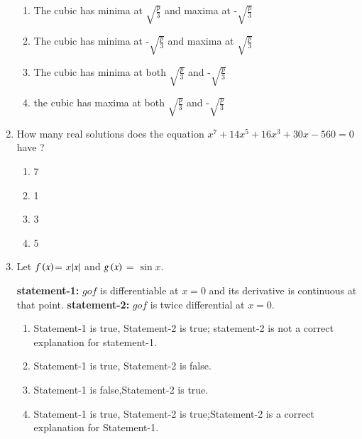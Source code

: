 \documentclass[journal,12pt,onecolumn]{IEEEtran}
\theoremstyle{remark}
\begin{document}
\begin{enumerate}
\begin{enumerate}
        \item The cubic has minima at $\sqrt{\frac{p}{3}}$ and maxima at -$\sqrt{\frac{p}{3}}$
        \item The cubic has minima at -$\sqrt{\frac{p}{3}}$ and maxima at $\sqrt{\frac{p}{3}}$
        \item The cubic has minima at both $\sqrt{\frac{p}{3}}$ and -$\sqrt{\frac{p}{3}}$
        \item the cubic has maxima at both $\sqrt{\frac{p}{3}}$ and -$\sqrt{\frac{p}{3}}$
        
        
        \end{enumerate}
        
            
        \item How many real solutions does the equation $ x^7 + 14x^5 + 16x^3 + 30x- 560 = 0$ have ? \hfill{}
         \begin{multicols}{4}
        \begin{enumerate}
    
            
        
            \item 7
        \item 1
        \item 3
        \item 5
        
        \end{enumerate}
        \end{multicols}
            
        \item Let $f\left(x\right)$= $x$$\left\vert x\right\vert$ and $g\left(x\right)$ = $\sin{x}$. 
        
    \textbf{statement-1:}  $gof$ is differentiable at $x=0$ and its derivative is continuous at that point. 
            \textbf{statement-2:  }$gof$ is twice differential at $x = 0$.  
                 \hfill{} 
                  
        
    
        \begin{enumerate}
        
            
        
            \item Statement-1 is true, Statement-2 is true; statement-2 is not a correct explanation for statement-1.  
            
        \item Statement-1 is true, Statement-2 is false.  
        \item Statement-1 is false,Statement-2 is true.  
        \item Statement-1 is true, Statement-2 is true;Statement-2 is a correct explanation for Statement-1.  


\end{enumerate}
\end{enumerate}
\end{document}
